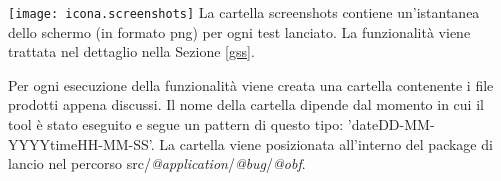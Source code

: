\begin{tcolorbox}[colback=white, colframe=lightgray]
	 \texttt{[image: icona.screenshots]} \newline
La cartella screenshots contiene un'istantanea dello schermo (in formato png) per ogni test lanciato. La funzionalità viene trattata nel dettaglio nella Sezione \ref{gss}.
\end{tcolorbox}

\noindent Per ogni esecuzione della funzionalità viene creata una cartella contenente i file prodotti appena discussi. Il nome della cartella dipende dal momento in cui il tool è stato eseguito e segue un pattern di questo tipo: 'dateDD-MM-YYYYtimeHH-MM-SS'. La cartella viene posizionata all'interno del package di lancio nel percorso  src/\emph{@application}/\emph{@bug}/\emph{@obf}.   
\newpage


